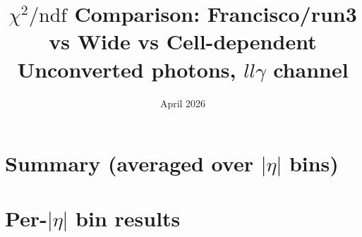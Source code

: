 \documentclass[a4paper,10pt]{article}
\title{$\chi^2/\text{ndf}$ Comparison: Francisco/run3 vs Wide vs Cell-dependent\\
\large Unconverted photons, $ll\gamma$ channel}
\date{April 2026}
\author{}
\begin{document}
\maketitle
\thispagestyle{empty}

\section*{Summary (averaged over $|\eta|$ bins)}


\clearpage
\section*{Per-$|\eta|$ bin results}

\end{document}
